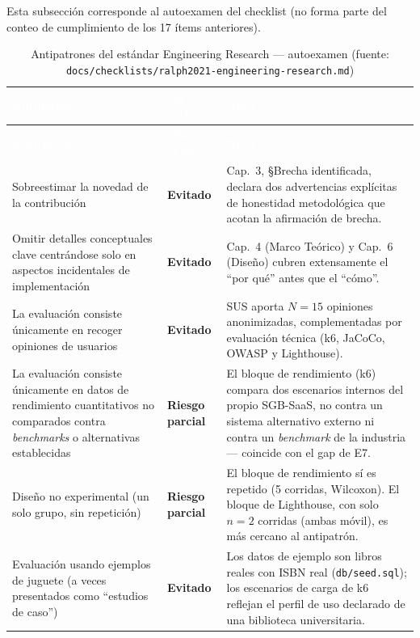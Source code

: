 Esta subsección corresponde al autoexamen del checklist (no forma parte
del conteo de cumplimiento de los 17 ítems anteriores).

\begin{center}
\scriptsize
\renewcommand{\arraystretch}{1.15}
\begin{longtable}{|p{4.5cm}|p{2.0cm}|p{7.0cm}|}
\caption{Antipatrones del estándar Engineering Research --- autoexamen
  (fuente: \texttt{docs/checklists/ralph2021-engineering-research.md})}
\label{tab:anexo-ralph-antipatrones}\\
\hline
\rowcolor{verdeuteq}
\textcolor{white}{\textbf{Antipatrón}} &
\textcolor{white}{\textbf{¿Se evitó?}} &
\textcolor{white}{\textbf{Nota}} \\
\hline
\endfirsthead
\hline
\rowcolor{verdeuteq}
\textcolor{white}{\textbf{Antipatrón}} &
\textcolor{white}{\textbf{¿Se evitó?}} &
\textcolor{white}{\textbf{Nota}} \\
\hline
\endhead
\hline
\endfoot
Sobreestimar la novedad de la contribución & \textbf{Evitado} & Cap.\ 3, §Brecha identificada, declara dos advertencias explícitas de honestidad metodológica que acotan la afirmación de brecha. \\
\hline
Omitir detalles conceptuales clave centrándose solo en aspectos incidentales de implementación & \textbf{Evitado} & Cap.\ 4 (Marco Teórico) y Cap.\ 6 (Diseño) cubren extensamente el ``por qué'' antes que el ``cómo''. \\
\hline
La evaluación consiste únicamente en recoger opiniones de usuarios & \textbf{Evitado} & SUS aporta $N=15$ opiniones anonimizadas, complementadas por evaluación técnica (k6, JaCoCo, OWASP y Lighthouse). \\
\hline
La evaluación consiste únicamente en datos de rendimiento cuantitativos no comparados contra \emph{benchmarks} o alternativas establecidas & \textbf{Riesgo parcial} & El bloque de rendimiento (k6) compara dos escenarios internos del propio SGB-SaaS, no contra un sistema alternativo externo ni contra un \emph{benchmark} de la industria --- coincide con el gap de E7. \\
\hline
Diseño no experimental (un solo grupo, sin repetición) & \textbf{Riesgo parcial} & El bloque de rendimiento sí es repetido (5 corridas, Wilcoxon). El bloque de Lighthouse, con solo $n=2$ corridas (ambas móvil), es más cercano al antipatrón. \\
\hline
Evaluación usando ejemplos de juguete (a veces presentados como ``estudios de caso'') & \textbf{Evitado} & Los datos de ejemplo son libros reales con ISBN real (\texttt{db/seed.sql}); los escenarios de carga de k6 reflejan el perfil de uso declarado de una biblioteca universitaria. \\
\hline
\end{longtable}
\end{center}

